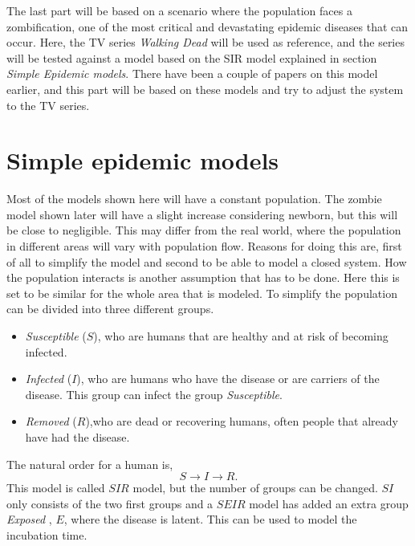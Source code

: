 \documentclass[%
twoside,                 %
final,                   %
chapterprefix=true,      %
open=right               %
10pt]{book}
\begin{document}
\vspace{3mm}




\vspace{3mm}


The last part will be based on a scenario where the population faces a zombification, one of the most critical and devastating epidemic diseases that can occur. Here, the TV series \emph{Walking Dead} will be used as reference, and the series will be tested against a model based on the SIR model explained in section \emph{Simple Epidemic models}. There have been a couple of papers on this model earlier, and this part will be based on these models and try to adjust the system to the TV series.     
\section{Simple epidemic models}
Most of the models shown here will have a constant population. The zombie model shown later will have a slight increase considering newborn, but this will be close to negligible. This may differ from the real world, where the population in different areas will vary with population flow. Reasons for doing this are, first of all to simplify the model and second to be able to model a closed system. How the population interacts is another assumption that has to be done. Here this is set to be similar for the whole area that is modeled. To simplify the population can be divided into three different groups. 
\begin{itemize}
\item \emph{Susceptible} ($S$), who are humans that are healthy and at risk of becoming infected. 

\item \emph{Infected} ($I$), who are humans who have the disease or are carriers of the disease. This group can infect the group \emph{Susceptible}. 

\item \emph{Removed} ($R$),who are dead or recovering humans, often people that already have had the disease. 
\end{itemize}

\noindent
The natural order for a human is,
\begin{equation*}
S \rightarrow I \rightarrow R.
\end{equation*}
This model is called $SIR$ model, but the number of groups can be changed. $SI$ only consists of the two first groups and a $SEIR$ model has added an extra group \emph{Exposed} , $E$, where the disease is latent. This can be used to model the incubation time. 
\end{document}
